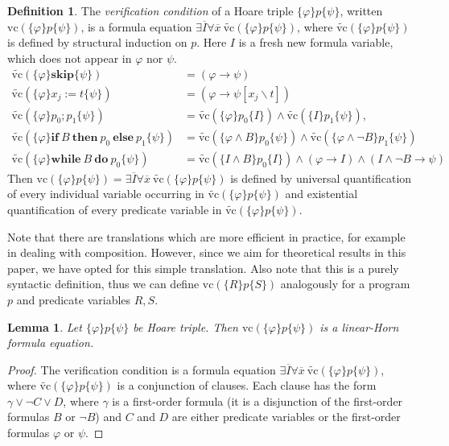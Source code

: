 \documentclass[acmsmall]{acmart}
\theoremstyle{plain}
\newtheorem{lemma}[theorem]{Lemma}
\theoremstyle{definition}
\newtheorem{definition}[theorem]{Definition}
\newcommand{\mybar}[1]{\overline{#1}}
\newcommand{\hoare}[3]{\{#1\}#2\{#3\}}
\newcommand{\vc}{\mathrm{vc}}
\newcommand{\vct}{\tilde{\vc}}
\newcommand{\hskipit}{\textbf{skip}}
\newcommand{\hif}{\textbf{if}~}
\newcommand{\hthen}{~\textbf{then}~}
\newcommand{\helse}{~\textbf{else}~}
\newcommand{\hwhile}{\textbf{while}~}
\newcommand{\hdo}{~\textbf{do}~}
\begin{document}
\begin{definition}
	The \emph{verification condition} of a Hoare triple $\hoare{\varphi}{p}{\psi}$, written $\vc(\hoare{\varphi}{p}{\psi})$, is a formula equation $\exists \mybar{I} \forall \mybar{x}~ \vct(\hoare{\varphi}{p}{\psi})$, where $\vct(\hoare{\varphi}{p}{\psi})$ is defined by structural induction on $p$. Here $I$ is a fresh new formula variable, which does not appear in $\varphi$ nor $\psi$.
	\begin{align*}
		\vct(\hoare{\varphi}{\hskipit}{\psi}) &= (\varphi \rightarrow \psi)\\
		\vct(\hoare{\varphi}{x_j := t}{\psi}) &= (\varphi \rightarrow \psi[x_j\backslash t])\\
		\vct(\hoare{\varphi}{p_0;p_1}{\psi}) &= \vct(\hoare{\varphi}{p_0}{I}) \wedge \vct(\hoare{I}{p_1}{\psi}), \\
		\vct(\hoare{\varphi}{\hif B \hthen p_0 \helse p_1}{\psi}) &= \vct(\hoare{\varphi\wedge B}{p_0}{\psi}) \wedge \vct(\hoare{\varphi\wedge \neg B}{p_1}{\psi})\\
		\vct(\hoare{\varphi}{\hwhile B \hdo p_0}{\psi}) &= \vct(\hoare{I \wedge B}{p_0}{I}) \wedge (\varphi \rightarrow I) \wedge (I \wedge \neg B \rightarrow \psi)
	\end{align*}
	Then $\vc(\hoare{\varphi}{p}{\psi}) = \exists \mybar{I} \forall \mybar{x}~ \vct(\hoare{\varphi}{p}{\psi})$ is defined by universal quantification of every individual variable occurring in $\vct(\hoare{\varphi}{p}{\psi})$ and existential quantification of every predicate variable in $\vct(\hoare{\varphi}{p}{\psi})$.
\end{definition}
Note that there are translations which are more efficient in practice, for example in
 dealing with composition.
However, since we aim for theoretical results in this paper, we have opted for this simple
 translation.
Also note that this is a purely syntactic definition, thus we can define
 $\vc(\hoare{R}{p}{S})$ analogously for a program $p$ and predicate variables $R,S$.

\begin{lemma}
	Let $\hoare{\varphi}{p}{\psi}$ be Hoare triple. Then $\vc(\hoare{\varphi}{p}{\psi})$ is a linear-Horn formula equation.
\end{lemma}
\begin{proof}
	The verification condition is a formula equation $\exists \mybar{I} \forall \mybar{x}~ \vct(\hoare{\varphi}{p}{\psi})$, where $\vct(\hoare{\varphi}{p}{\psi})$ is a conjunction of clauses. Each clause has the form $\gamma \vee \neg C \vee D$, where $\gamma$ is a first-order formula (it is a disjunction of the first-order formulas $B$ or $\neg B$) and $C$ and $D$ are either predicate variables or the first-order formulas $\varphi$ or $\psi$.
\end{proof}
\end{document}

